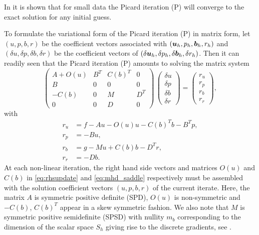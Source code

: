 In \cite{schotzau2004mixed} it is shown that for small data the Picard iteration (P) will converge to the exact solution for any initial guess.

To formulate the variational form of the Picard iteration (P) in matrix form, let $({u},p,{b},r)$ be the coefficient vectors associated with $(\boldsymbol u_h,p_h,\boldsymbol b_h,r_h)$ and $(\delta{u},\delta p,\delta{b},\delta r)$ be the coefficient vectors of $(\delta \boldsymbol u_h,\delta p_h,\delta \boldsymbol b_h,\delta r_h)$. Then it can readily seen that the Picard iteration (P) amounts to solving the matrix system
\begin{equation}
\label{eq:mhd_saddle}
\left(
\begin{array}{cccc}
A+O(u) & B^T & C(b)^T & 0\\
B & 0 & 0 & 0 \\
-C(b) & 0 & M & D^T\\
0 & 0 & D & 0
\end{array}
\right)
\,
\left(
\begin{array}{c}
\delta u\\
\delta p\\
\delta b\\
\delta r
\end{array}
\right)  =
\begin{pmatrix}
r_u \\
r_p\\
r_b\\
r_r
\end{pmatrix},
\end{equation}
with
\begin{equation} \label{eq:rhsupdate}
\begin{array}{rl}
r_u &= f- Au -O(u) u - C(b)^T b- B^T p,\\
r_p &=-B u,\\
r_b &=g-Mu+C(b)b-D^T r,\\
r_r &=-D b.
\end{array}
\end{equation}
At each non-linear iteration, the right hand side vectors and matrices $O(u)$ and $C(b)$ in \eqref{eq:rhsupdate} and \eqref{eq:mhd_saddle} respectively must be assembled with the solution coefficient vectors $({u},p,{b},r)$ of the current iterate. Here, the matrix $A$  is symmetric positive definite (SPD), $O(u)$ is non-symmetric and $-C(b)$, $C(b)^T$ appear in a skew symmetric fashion. We also note that $M$ is symmetric positive semidefinite (SPSD) with nullity $m_b$ corresponding to the dimension of the scalar space $S_h$ giving rise to the discrete gradients, see \cite{greif2007preconditioners}.


